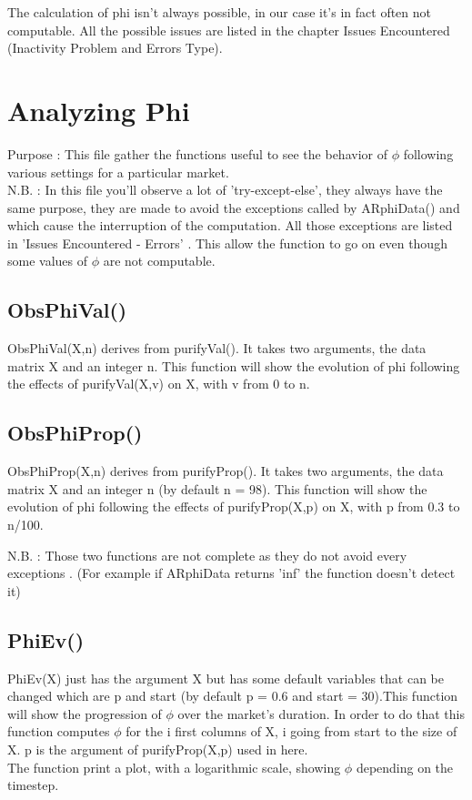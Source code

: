 \documentclass{report}
\begin{document}
The calculation of phi isn't always possible, in our case it's in fact often not computable. All the possible issues are listed in the chapter Issues Encountered (Inactivity Problem and Errors Type).

\section{Analyzing Phi}

Purpose : This file gather the functions useful to see the behavior of $\phi $ following various settings for a particular market. \\
N.B. : In this file you'll observe a lot of 'try-except-else', they always have the same purpose, they are made to avoid the exceptions called by ARphiData() and which cause the interruption of the computation. All those exceptions are listed in 'Issues Encountered - Errors' . This allow the function to go on even though some values of $\phi $ are not computable.

\subsection{ObsPhiVal()}

ObsPhiVal(X,n) derives from purifyVal(). It takes two arguments, the data matrix X and an integer n. This function will show the evolution of phi following the effects of purifyVal(X,v) on X, with v from 0 to n. 

\subsection{ObsPhiProp()}

ObsPhiProp(X,n) derives from purifyProp(). It takes two arguments, the data matrix X and an integer n (by default n = 98). This function will show the evolution of phi following the effects of purifyProp(X,p) on X, with p from 0.3 to n/100. 

N.B. : Those two functions are not complete as they do not avoid every exceptions . (For example if ARphiData returns 'inf' the function doesn't detect  it)

\subsection{PhiEv()}

PhiEv(X) just has the argument X but has some default variables that can be changed which are p and start (by default p = 0.6 and start = 30).This function will show the progression of $\phi $ over the market's duration. In order to do that this function computes $\phi $ for the i first columns of X, i going from start to the size of X. p is the argument of purifyProp(X,p) used in here. \\
The function print a plot, with a logarithmic scale, showing $\phi $ depending on the timestep.
\end{document}
